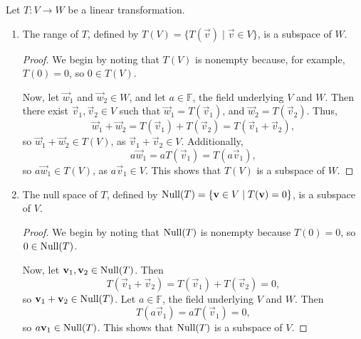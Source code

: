 \documentclass{homework}
\begin{document}
	\question Let $T : V \to W$ be a linear transformation.
	\begin{enumerate}
		\item The range of $T$, defined by $T(V) = \{T(\vec{v}) \mid \vec{v} \in V\}$, is a subspace of $W$.
		\begin{proof}
			We begin by noting that $T(V)$ is nonempty because, for example, $T(0) =0$, so $0 \in T(V)$. 
			
			Now, let $\vec{w}_1$ and $\vec{w}_2 \in W$, and let $a \in \mathbb{F}$, the field underlying $V$ and $W$. Then there exist $\vec{v}_1, \vec{v}_2 \in V$ such that $\vec{w}_1 = T(\vec{v}_1)$, and $\vec{w}_2 = T(\vec{v}_2)$. Thus,
			\begin{equation*}
				\vec{w}_1  + \vec{w}_2 = T(\vec{v}_1) + T(\vec{v}_2) = T(\vec{v}_1 + \vec{v}_2),
			\end{equation*}
			so $\vec{w}_1 + \vec{w}_2 \in T(V)$, as $\vec{v}_1 + \vec{v}_2 \in V$. Additionally,
			\begin{equation*}
				a\vec{w}_1 = aT(\vec{v}_1) = T(a\vec{v}_1),
			\end{equation*}
			so $a\vec{w}_1 \in T(V)$, as $a\vec{v}_1\in V$. This shows that $T(V)$ is a subspace of $W$.
		\end{proof}
		
		\item The null space of $T$, defined by $\mathrm{Null}(T) = \{\mathbf{v} \in V \mid T(\mathbf{v}) = 0\}$, is a subspace of $V$.
		\begin{proof}
			We begin by noting that $\mathrm{Null}(T)$ is nonempty because $T(0) = 0$, so $0 \in \mathrm{Null}(T)$.
			
			Now, let $\mathbf{v}_1, \mathbf{v}_2 \in \mathrm{Null}(T)$. Then
			\begin{equation*}
				T(\vec{v}_1 + \vec{v}_2) = T(\vec{v}_1) + T(\vec{v}_2) = 0,
			\end{equation*}
			so $\mathbf{v}_1 +\mathbf{v}_2 \in \mathrm{Null}(T)$. Let $a \in \mathbb{F}$, the field underlying $V$ and $W$. Then
			\begin{equation*}
				T(a\vec{v}_1) = aT(\vec{v}_1) = 0,
			\end{equation*}
			so $a\mathbf{v}_1 \in \mathrm{Null}(T)$. This shows that $\mathrm{Null}(T)$ is a subspace of $V$.
		\end{proof}
	\end{enumerate}
\end{document}
